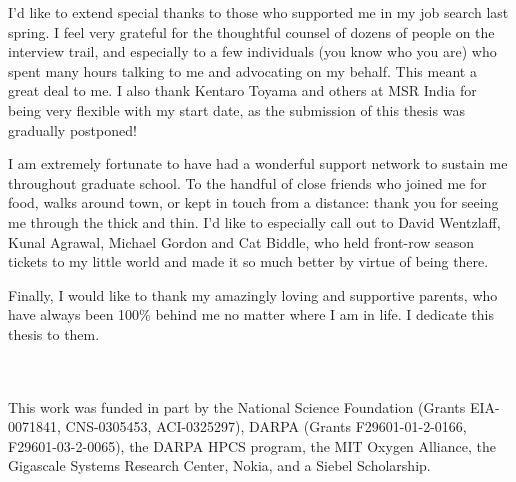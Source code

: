 I'd like to extend special thanks to those who supported me in my job
search last spring.  I feel very grateful for the thoughtful counsel
of dozens of people on the interview trail, and especially to a few
individuals (you know who you are) who spent many hours talking to me
and advocating on my behalf.  This meant a great deal to me.  I also
thank Kentaro Toyama and others at MSR India for being very flexible
with my start date, as the submission of this thesis was gradually
postponed!

I am extremely fortunate to have had a wonderful support network to
sustain me throughout graduate school.  To the handful of close
friends who joined me for food, walks around town, or kept in touch
from a distance: thank you for seeing me through the thick and thin.
I'd like to especially call out to David Wentzlaff, Kunal Agrawal,
Michael Gordon and Cat Biddle, who held front-row season tickets to my
little world and made it so much better by virtue of being there.

Finally, I would like to thank my amazingly loving and supportive
parents, who have always been 100\% behind me no matter where I am
in life.  I dedicate this thesis to them.

\clearpage
~ \\ \vspace{3.49in} ~ \\
\noindent This work was funded in part by the National Science 
Foundation (Grants EIA-0071841, CNS-0305453, ACI-0325297), DARPA
(Grants F29601-01-2-0166, F29601-03-2-0065), the DARPA HPCS program,
the MIT Oxygen Alliance, the Gigascale Systems Research Center, Nokia,
and a Siebel Scholarship.
\vspace{-0.2in}
\clearpage

